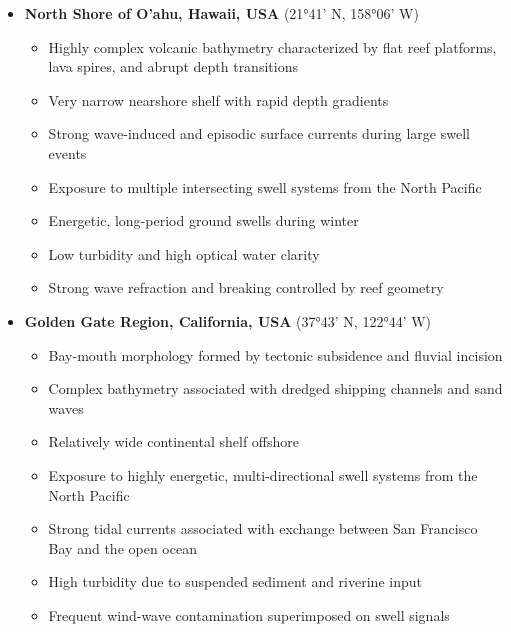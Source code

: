 \documentclass[12pt]{article}
\begin{document}
{\small
\begin{itemize}

    \item \textbf{North Shore of O'ahu, Hawaii, USA} (21°41' N, 158°06' W)
    \begin{itemize}
        \item Highly complex volcanic bathymetry characterized by flat reef platforms, lava spires, and abrupt depth transitions
        \item Very narrow nearshore shelf with rapid depth gradients
        \item Strong wave-induced and episodic surface currents during large swell events
        \item Exposure to multiple intersecting swell systems from the North Pacific
        \item Energetic, long-period ground swells during winter
        \item Low turbidity and high optical water clarity
        \item Strong wave refraction and breaking controlled by reef geometry
    \end{itemize}

    \item \textbf{Golden Gate Region, California, USA} (37°43' N, 122°44' W)
    \begin{itemize}
        \item Bay-mouth morphology formed by tectonic subsidence and fluvial incision
        \item Complex bathymetry associated with dredged shipping channels and sand waves
        \item Relatively wide continental shelf offshore
        \item Exposure to highly energetic, multi-directional swell systems from the North Pacific
        \item Strong tidal currents associated with exchange between San Francisco Bay and the open ocean
        \item High turbidity due to suspended sediment and riverine input
        \item Frequent wind-wave contamination superimposed on swell signals
    \end{itemize}


\end{itemize}}
\end{document}
